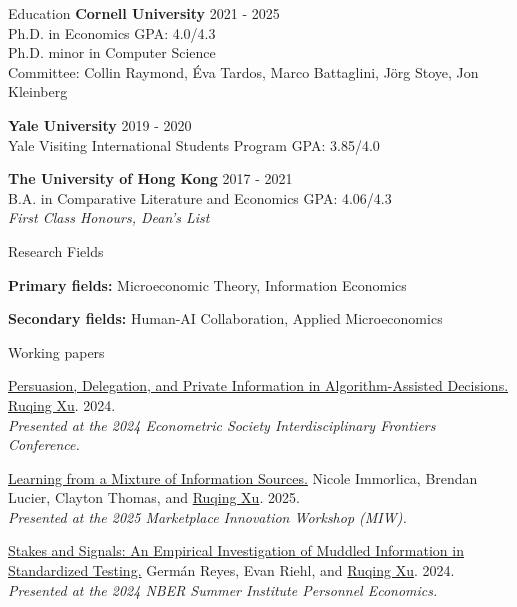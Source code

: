 \documentclass{resume} %
\begin{document}

\begin{rSection}{Education}
{\bf Cornell University} \hfill {2021 - 2025} 
\\ Ph.D. in Economics \hfill {GPA: 4.0/4.3} \\
Ph.D. minor in Computer Science \hfill 
\\ Committee: Collin Raymond, \'{E}va Tardos, Marco Battaglini, J\"{o}rg Stoye, Jon Kleinberg\hfill

{\bf Yale University} \hfill {2019 - 2020} 
\\ Yale Visiting International Students Program \hfill {GPA: 3.85/4.0}

{\bf The University of Hong Kong} \hfill {2017 - 2021} 
\\ B.A. in Comparative Literature and Economics \hfill {GPA: 4.06/4.3}
\\ \emph{First Class Honours, Dean's List}

\end{rSection}

\begin{rSection}{Research Fields} \itemsep -5pt
\item \textbf{Primary fields:} Microeconomic Theory, Information Economics
\item \textbf{Secondary fields:} Human-AI Collaboration, Applied Microeconomics
\end{rSection}

\begin{rSection}{Working papers}

  \href{https://ruqing-xu.github.io/assets/pdf/delegation_xu.pdf}{Persuasion, Delegation, and Private Information in Algorithm-Assisted Decisions.} \underline{Ruqing Xu}. 2024. \\
 \emph{Presented at the 2024 Econometric Society Interdisciplinary Frontiers Conference.}

\href{https://ruqing-xu.github.io/assets/pdf/LearningfromMixture.pdf}{Learning from a Mixture of Information Sources.} Nicole Immorlica, Brendan Lucier, Clayton Thomas, and \underline{Ruqing Xu}. 2025.\\
\emph{Presented at the 2025 Marketplace Innovation Workshop (MIW).}

\href{https://ruqing-xu.github.io/assets/pdf/rrx_stakes_june2024.pdf}{Stakes and Signals: An Empirical Investigation of Muddled
Information in Standardized Testing.} Germán Reyes, Evan Riehl, and \underline{Ruqing Xu}. 2024. \\
\emph{Presented at the 2024 NBER Summer Institute Personnel Economics.}


\end{rSection}
\end{document}

